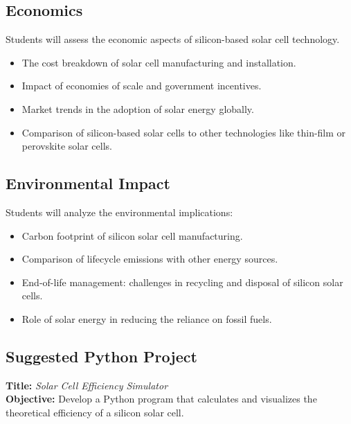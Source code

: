 \documentclass[11pt]{article}
\begin{document}
\subsection{Economics}
Students will assess the economic aspects of silicon-based solar cell technology.
\begin{itemize}
    \item The cost breakdown of solar cell manufacturing and installation.
    \item Impact of economies of scale and government incentives.
    \item Market trends in the adoption of solar energy globally.
    \item Comparison of silicon-based solar cells to other technologies like thin-film or perovskite solar cells.
\end{itemize}

\subsection*{Environmental Impact}
Students will analyze the environmental implications:
\begin{itemize}
    \item Carbon footprint of silicon solar cell manufacturing.
    \item Comparison of lifecycle emissions with other energy sources.
    \item End-of-life management: challenges in recycling and disposal of silicon solar cells.
    \item Role of solar energy in reducing the reliance on fossil fuels.
\end{itemize}

\subsection{Suggested Python Project}
\textbf{Title:} \textit{Solar Cell Efficiency Simulator}  \\
\textbf{Objective:} Develop a Python program that calculates and visualizes the theoretical efficiency of a silicon solar cell.  \\
\end{document}
